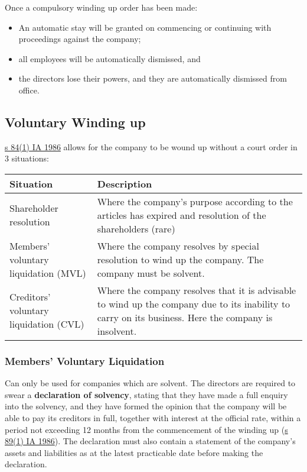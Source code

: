 \documentclass[
]{article}
\providecommand{\tightlist}{%
  \setlength{\itemsep}{0pt}\setlength{\parskip}{0pt}}
\begin{document}
Once a compulsory winding up order has been made:

\begin{itemize}
\tightlist
\item
  An automatic stay will be granted on commencing or continuing with
  proceedings against the company;
\item
  all employees will be automatically dismissed, and
\item
  the directors lose their powers, and they are automatically dismissed
  from office.
\end{itemize}

\hypertarget{voluntary-winding-up}{%
\subsection{Voluntary Winding up}\label{voluntary-winding-up}}

\href{https://www.legislation.gov.uk/ukpga/1986/45/section/84}{s 84(1)
IA 1986} allows for the company to be wound up without a court order in
3 situations:

\begin{longtable}[]{@{}ll@{}}
\toprule()
Situation & Description \\
\midrule()
\endhead
Shareholder resolution & Where the company's purpose according to the
articles has expired and resolution of the shareholders (rare) \\
Members' voluntary liquidation (MVL) & Where the company resolves by
special resolution to wind up the company. The company must be
solvent. \\
Creditors' voluntary liquidation (CVL) & Where the company resolves that
it is advisable to wind up the company due to its inability to carry on
its business. Here the company is insolvent. \\
\bottomrule()
\end{longtable}

\hypertarget{members-voluntary-liquidation}{%
\subsubsection{Members' Voluntary
Liquidation}\label{members-voluntary-liquidation}}

Can only be used for companies which are solvent. The directors are
required to swear a \textbf{declaration of solvency}, stating that they
have made a full enquiry into the solvency, and they have formed the
opinion that the company will be able to pay its creditors in full,
together with interest at the official rate, within a period not
exceeding 12 months from the commencement of the winding up
(\href{https://www.legislation.gov.uk/ukpga/1986/45/section/89}{s 89(1)
IA 1986}). The declaration must also contain a statement of the
company's assets and liabilities as at the latest practicable date
before making the declaration.
\end{document}
